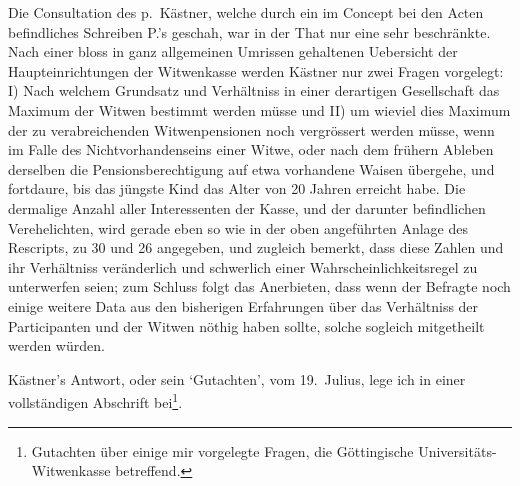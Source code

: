 \documentclass[12pt,a4paper]{article}
\begin{document}
Die Consultation des p.\ K\"astner, welche durch ein im Concept bei den Acten befindliches Schreiben P.'s geschah, war in der That nur eine sehr beschr\"ankte. Nach einer bloss in ganz allgemeinen Umrissen gehaltenen Uebersicht der Haupteinrichtungen der Witwenkasse werden K\"astner nur zwei Fragen vorgelegt: I) Nach welchem Grundsatz und Verh\"altniss in einer derartigen Gesellschaft das Maximum der Witwen bestimmt werden m\"usse und II) um wieviel dies Maximum der zu verabreichenden Witwenpensionen noch vergr\"ossert werden m\"usse, wenn im Falle des Nichtvorhandenseins einer Witwe, oder nach dem fr\"uhern Ableben derselben die Pensionsberechtigung auf etwa vorhandene Waisen \"ubergehe, und fortdaure, bis das j\"ungste Kind das Alter von 20 Jahren erreicht habe. Die dermalige Anzahl aller Interessenten der Kasse, und der darunter befindlichen Verehelichten, wird gerade eben so wie in der oben angef\"uhrten Anlage des Rescripts, zu 30 und 26 angegeben, und zugleich bemerkt, dass diese Zahlen und ihr Verh\"altniss ver\"anderlich und schwerlich einer Wahrscheinlichkeitsregel zu unterwerfen seien; zum Schluss folgt das Anerbieten, dass wenn der Befragte noch einige weitere Data aus den bisherigen Erfahrungen \"uber das Verh\"altniss der Participanten und der Witwen n\"othig haben sollte, solche sogleich mitgetheilt werden w\"urden.

K\"astner's Antwort, oder sein `Gutachten', vom 19.\ Julius, lege ich in einer vollst\"andigen Abschrift bei\footnote{Gutachten \"uber einige mir vorgelegte Fragen, die G\"ottingische Universit\"ats-Witwenkasse betreffend.}. 
\end{document}
